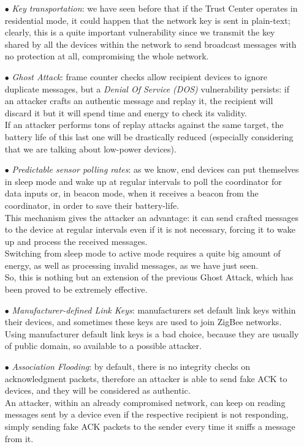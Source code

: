 \documentclass[12pt]{report}
\begin{document}
{\begin{itemize}
\item[$\bullet$] \emph{Key transportation}: we have seen before that if the Trust Center operates in residential mode, it could happen that the network key is sent in plain-text; clearly, this is a quite important vulnerability since we transmit the key shared by all the devices within the network to send broadcast messages with no protection at all, compromising the whole network.

\item[$\bullet$] \emph{Ghost Attack}: frame counter checks allow recipient devices to ignore duplicate messages, but a \emph{Denial Of Service (DOS)} vulnerability persists: if an attacker crafts an authentic message and replay it, the recipient will discard it but it will spend time and energy to check its validity.\\
If an attacker performs tons of replay attacks against the same target, the battery life of this last one will be drastically reduced (especially considering that we are talking about low-power devices).

\item[$\bullet$] \emph{Predictable sensor polling rates}: as we know, end devices can put themselves in sleep mode and wake up at regular intervals to poll the coordinator for data inputs or, in beacon mode, when it receives a beacon from the coordinator, in order to save their battery-life.\\
This mechanism gives the attacker an advantage: it can send crafted messages to the device at regular intervals even if it is not necessary, forcing it to wake up and process the received messages.\\
Switching from sleep mode to active mode requires a quite big amount of energy, as well as processing invalid messages, as we have just seen.\\
So, this is nothing but an extension of the previous Ghost Attack, which has been proved to be extremely effective.

\item[$\bullet$] \emph{Manufacturer-defined Link Keys}: manufacturers set default link keys within their devices, and sometimes these keys are used to join ZigBee networks.\\
Using manufacturer default link keys is a bad choice, because they are usually of public domain, so available to a possible attacker.

\item[$\bullet$] \emph{Association Flooding}: by default, there is no integrity checks on acknowledgment packets, therefore an attacker is able to send fake ACK to devices, and they will be considered as authentic.\\
An attacker, within an already compromised network, can keep on reading messages sent by a device even if the respective recipient is not responding, simply sending fake ACK packets to the sender every time it sniffs a message from it. 


\end{itemize}}
\end{document}
